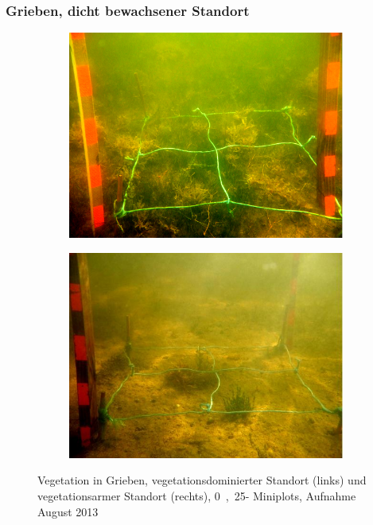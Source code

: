 \subsubsection{Grieben, dicht bewachsener Standort}


\begin{figure}[!htb]
        \centering
        \begin{subfigure}[htb]{width=0.45\textwidth}
                \includegraphics[width=\textwidth]{images/plotpictures/Bsp_G+M}
        \end{subfigure}
        \begin{subfigure}[htb]{width=0.45\textwidth}
                \includegraphics[width=\textwidth]{images/plotpictures/Bsp_G-M}
        \end{subfigure}
        \caption[Fotoaufnahmen der Vegetation in Grieben]{Vegetation in Grieben, vegetationsdominierter 						Standort (links) und  vegetationsarmer Standort (rechts), \unit{0,25}{\metre\squared}- 							Miniplots, Aufnahme August 2013}
        \label{fig:fotos_grieben}
\end{figure}

